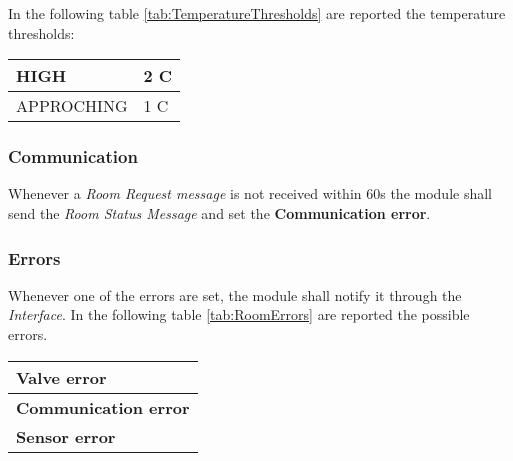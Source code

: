 In the following table \ref{tab:TemperatureThresholds} are reported the temperature thresholds:
\begin{center}
	\begin{tabular}{||l | l||} 
		\hline
		HIGH 		& 2 C\degree \\ 
		\hline
		APPROCHING 	& 1 C\degree \\ 
		\hline
	\end{tabular}
\end{center}


\subsubsection{Communication}
Whenever a \textit{Room Request message} is not received within 60s the module shall send the \textit{Room Status Message} and set the \textbf{Communication error}.

\subsubsection{Errors}
Whenever one of the errors are set, the module shall notify it through the \textit{Interface}.
In the following table \ref{tab:RoomErrors} are reported the possible errors.
\begin{center}
	\begin{tabular}{|| l ||} 
		\hline
		\textbf{Valve error} \\ 
		\hline
		\textbf{Communication error} \\ 
		\hline
		\textbf{Sensor error} \\ 
		\hline
	\end{tabular}
\end{center}
